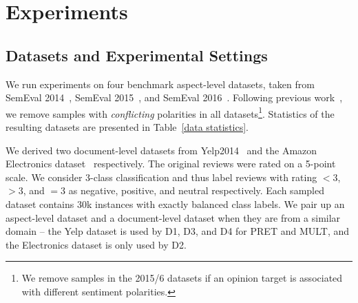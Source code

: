 \documentclass[11pt,a4paper]{article}
\begin{document}
\begin{table*}[t]
\centering
\small
{}
\caption{PRET with different transferred layers. Averaged results over 5 runs are reported.}\label{ablation test}
\end{table*}

\section{Experiments}
\subsection{Datasets and Experimental Settings}
We run experiments on four benchmark aspect-level datasets, taken from SemEval 2014~\cite{Pontiki:14}, SemEval 2015~\cite{Pontiki:15}, and SemEval 2016~\cite{Pontiki:16}. Following previous work~\cite{Tang:16b,Wang:16}, we remove samples with \emph{conflicting} polarities in all datasets\footnote{We remove samples in the 2015/6 datasets if an opinion target is associated with different sentiment polarities.}. Statistics of the resulting datasets are presented in Table~\ref{data statistics}.

We derived two document-level datasets from Yelp2014~\cite{tang:15} and the Amazon Electronics dataset~\cite{Mcauley:15} respectively. The original reviews were rated on a 5-point scale. We consider 3-class classification and thus label reviews with rating $<3$, $>3$, and $=3$ as negative, positive, and neutral respectively. Each sampled dataset contains 30k instances with exactly balanced class labels. We pair up an aspect-level dataset and a document-level dataset when they are from a similar domain -- the Yelp dataset is used by D1, D3, and D4 for PRET and MULT, and the Electronics dataset is only used by D2. 
\end{document}

